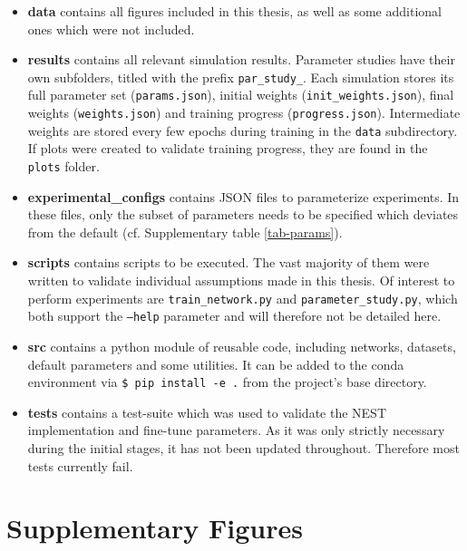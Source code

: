 \begin{itemize}
  \item \textbf{data} contains all figures included in this thesis, as well as some additional ones which were not
  included.
  \item \textbf{results} contains all relevant simulation results. Parameter studies have their own subfolders, titled
        with the prefix \texttt{par\_study\_}. Each simulation stores its full parameter set (\texttt{params.json}), initial
        weights (\texttt{init\_weights.json}), final weights (\texttt{weights.json}) and training progress
        (\texttt{progress.json}). Intermediate weights are stored every few epochs during training in the \texttt{data}
        subdirectory. If plots were created to validate training progress, they are found in the \texttt{plots} folder.
  \item \textbf{experimental\_configs} contains JSON files to parameterize experiments. In these files, only the subset
        of parameters needs to be specified which deviates from the default (cf. Supplementary table \ref{tab-params}).
  \item \textbf{scripts} contains scripts to be executed. The vast majority of them were written to validate individual
        assumptions made in this thesis. Of interest to perform experiments are \texttt{train\_network.py} and
        \texttt{parameter\_study.py}, which both support the \texttt{--help} parameter and will therefore not be detailed
        here.
  \item \textbf{src} contains a python module of reusable code, including networks, datasets, default parameters and
        some utilities. It can be added to the conda environment via \texttt{\$ pip install -e .} from the project's base
        directory.
  \item \textbf{tests} contains a test-suite which was used to validate the NEST implementation and fine-tune
        parameters. As it was only strictly necessary during the initial stages, it has not been updated throughout. Therefore
        most tests currently fail.
\end{itemize}


\newpage
\section{Supplementary Figures}


